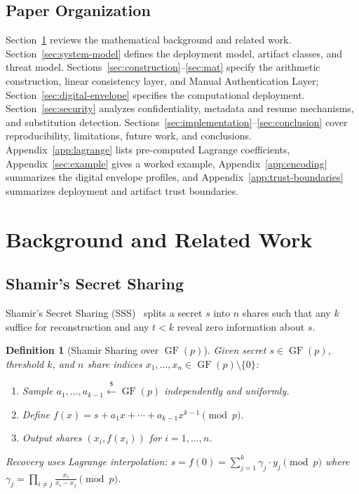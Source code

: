 \documentclass[11pt]{article}
\newcommand{\GF}{\operatorname{GF}}
\newtheorem{definition}[theorem]{Definition}
\begin{document}
\subsection{Paper Organization}

Section~\ref{sec:prelim} reviews the mathematical background and related work. Section~\ref{sec:system-model} defines the deployment model, artifact classes, and threat model. Sections~\ref{sec:construction}--\ref{sec:mat} specify the arithmetic construction, linear consistency layer, and Manual Authentication Layer; Section~\ref{sec:digital-envelope} specifies the computational deployment. Section~\ref{sec:security} analyzes confidentiality, metadata and resume mechanisms, and substitution detection. Sections~\ref{sec:implementation}--\ref{sec:conclusion} cover reproducibility, limitations, future work, and conclusions. Appendix~\ref{app:lagrange} lists pre-computed Lagrange coefficients, Appendix~\ref{sec:example} gives a worked example, Appendix~\ref{app:encoding} summarizes the digital envelope profiles, and Appendix~\ref{app:trust-boundaries} summarizes deployment and artifact trust boundaries.

\section{Background and Related Work}
\label{sec:prelim}

\subsection{Shamir's Secret Sharing}

Shamir's Secret Sharing (SSS)~\cite{shamir1979} splits a secret $s$ into $n$ shares such that any $k$ suffice for reconstruction and any $t < k$ reveal zero information about $s$.

\begin{definition}[Shamir Sharing over $\GF(p)$]
Given secret $s \in \GF(p)$, threshold $k$, and $n$ share indices $x_1, \ldots, x_n \in \GF(p) \setminus \{0\}$:
\begin{enumerate}[noitemsep]
    \item Sample $a_1, \ldots, a_{k-1} \xleftarrow{\$} \GF(p)$ independently and uniformly.
    \item Define $f(x) = s + a_1 x + \cdots + a_{k-1} x^{k-1} \pmod{p}$.
    \item Output shares $(x_i, f(x_i))$ for $i = 1, \ldots, n$.
\end{enumerate}
Recovery uses Lagrange interpolation: $s = f(0) = \sum_{j=1}^{k} \gamma_j \cdot y_j \pmod{p}$ where $\gamma_j = \prod_{i \neq j} \frac{x_i}{x_i - x_j} \pmod{p}$.
\end{definition}
\end{document}
